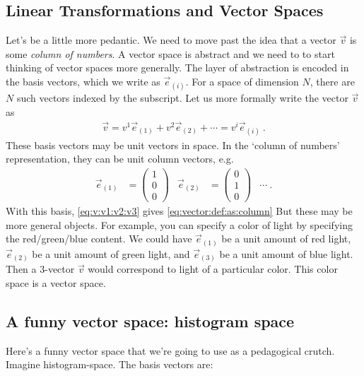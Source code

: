 \subsection{Linear Transformations and Vector Spaces}

Let’s be a little more pedantic. We need to move past the idea that a vector $\vec{v}$ is some \emph{column of numbers}. A vector space is abstract and we need to to start thinking of vector spaces more generally. The layer of abstraction is encoded in the basis vectors, which we write as $\vec{e}_{(i)}$. For a space of dimension $N$, there are $N$ such vectors indexed by the subscript. Let us more formally write the vector $\vec{v}$ as
\begin{align}
  \vec{v} = 
  v^1 \vec{e}_{(1)}
  +
  v^2 \vec{e}_{(2)} + \cdots
  = v^i \vec{e}_{(i)} \ .
  \label{eq:v:v1:v2:v3}
\end{align}
These basis vectors may be unit vectors in space. In the `column of numbers' representation, they can be unit column vectors, e.g.
\begin{align}
  \vec{e}_{(1)}
  &= 
  \begin{pmatrix}
  1 \\ 0 \\ 0
  \end{pmatrix}
  &
    \vec{e}_{(2)}
  &= 
  \begin{pmatrix}
  0 \\ 1 \\ 0
  \end{pmatrix}
  &
  \cdots \ .
\end{align}
With this basis, \eqref{eq:v:v1:v2:v3} gives \eqref{eq:vector:def:as:column}
But these may be more general objects. For example, you can specify a color of light by specifying the red/green/blue content. We could have $\vec{e}_{(1)}$ be a unit amount of red light, $\vec{e}_{(2)}$ be a unit amount of green light, and $\vec{e}_{(3)}$ be a unit amount of blue light. Then a 3-vector $\vec{v}$ would correspond to light of a particular color. This color space is a vector space.




\subsection{A funny vector space: histogram space}
\label{sec:histogramspace}

Here’s a funny vector space that we’re going to use as a pedagogical crutch. Imagine histogram-space. The basis vectors are:

